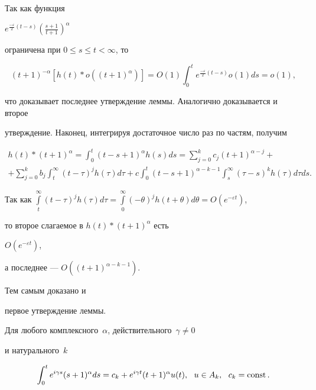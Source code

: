 \begin{pf}


Так как функция


$e^{\frac{-\varepsilon}2 (t-s)} (\frac{s+1}{t+1})^{\alpha}$


ограничена при $0\le s \le t < \infty$, то


$$


(t+1)^{-\alpha} [h(t)\ast o ((t+1)^ {\alpha}


) ]=O (1)\int_0^t e^{\frac{-\varepsilon}2 (t-


s)} o (1) ds=o (1),


$$


что доказывает последнее утверждение леммы. Аналогично доказывается и второе


утверждение. Наконец, интегрируя достаточное число раз по частям, получим


\begin{gather*}


h(t)\ast (t+1)^{\alpha}=\int_0^t (t-s+1)^{\alpha}


h (s) ds=\sum\limits_{j=0}^{k} c_j (t+1)^{\alpha-j}+\\


%


+\sum\limits_{j=0}^{k}b_j\int_t^\infty (t-\tau)^j


h (\tau) d\tau+c\int_{0}^t (t-s+1)^ {\alpha-k-1}


\int_s^\infty (\tau-s)^k h (\tau) d\tau ds.


\end{gather*}


Так как $\int\limits_t^\infty (t-


\tau)^{j}h (\tau)d\tau=\int\limits_0^\infty (-\theta)^{j} h (t+


\theta)d\theta=O (e^{{-\varepsilon}{t}})$,


то второе слагаемое в $ h(t)\ast (t+1)^{\alpha}$ есть


$O (e^{-\varepsilon t})$,


а последнее --- $O ((t+1)^ {\alpha-k-1})$. 


Тем самым доказано и


первое утверждение леммы.


\end{pf}








\begin{lem}


Для любого комплексного~$\alpha$, действительного~$\gamma\neq 0$ 


и натурального~$k$


$$


\int_0^t e^{i\gamma s}(s+1)^{\alpha}ds=c_k+e^{i\gamma t}(t+1)^{\alpha}


u (t),\ \ u \in A_k,\ \ c_k=\const.


$$


\end{lem}





